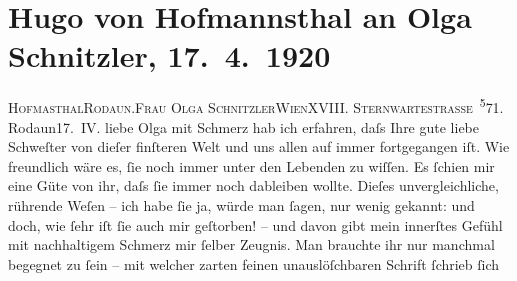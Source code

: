 

               \section[Hugo von Hofmannsthal an Olga Schnitzler, 17. 4. 1920]{ Hugo von Hofmannsthal an Olga Schnitzler, 17. 4. 1920}\nopagebreak{}\rehead{ }\begin{ledgroupsized}[t]{13cm}\normalsize\beginnumbering{} \toendnotes[C]{\smallbreak\pagebreak[2]} 
\toendnotes[C]{\smallbreak}\pstart{}{\pb}\textsc{Hofma{\geminationn}sthal}\pend{}\pstart{}\textsc{Rodaun.}\pend{}{\bigskip}\pstart{}\textsc{Frau Olga Schnitzler}\pend{}\pstart{}\textsc{Wien}\pend{}\pstart{}\textsc{XVIII. Sternwartestrasse \substVorne{}\textsuperscript{5}\substDazwischen{}7\substHinten{}1.}\pend{}{\bigskip}\pstart
           \raggedleft{}{\pb}Rodaun17. IV.\pend
           \pstart{}liebe Olga\pend\pstart
           mit Schmerz hab ich erfahren, daſs Ihre gute liebe Schweſter von dieſer finſteren Welt und uns allen auf immer
               fortgegangen iſt. Wie freundlich wäre es, ſie noch immer unter den Lebenden zu
               wiſſen. Es ſchien mir eine Güte von ihr, daſs ſie immer noch dableiben wollte. Dieſes
               unvergleichliche, rührende Weſen
               – ich habe ſie ja, {\pb}würde man ſagen, nur wenig
               gekannt: und doch, wie ſehr iſt ſie auch mir geſtorben! – und davon gibt mein innerſtes
               Gefühl mit nachhaltigem Schmerz mir ſelber Zeugnis. Man brauchte ihr nur manchmal
               begegnet zu ſein – mit welcher zarten feinen unauslöſchbaren Schrift ſchrieb ſich

\end{ledgroupsized}
